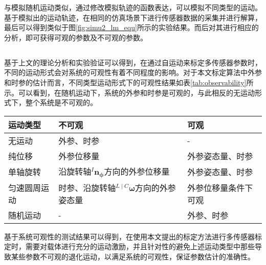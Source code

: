 与模拟随机运动类似，通过修改模拟轨迹的函数表达，可以模拟不同类型的运动。基于模拟出的运动轨迹，在相同的仿真场景下进行传感器数据的采集并进行解算，最后可以得到类似于图\ref{fig:simu2_lm_equ}所示的实验结果。而后对其进行相应的分析，即可获得可观的参数及不可观的参数。

\subsection{}
基于上文的理论分析和实验验证可以得到，在通过自运动来标定多传感器参数时，不同的运动形式会对系统的可观性有着不同程度的影响。对于本文标定算法中外参和时参的估计而言，不同类型运动形式下的可观性结果如表\ref{tab:observability}所示。可以看到，在随机运动下，系统的外参和时参是可观的，与此相反的无运动形式下，整个系统是不可观的。
\begin{table*}[htbp]
  \centering
  \normf
  \begin{tabular}{l|ll}
    \hline
    {运动类型}     & {不可观}                                                             & {可观}                 \\ \hline
    {无运动}       & {外参、时参}                                                         & {-}                    \\
    {纯位移}       & {外参位移量}                                                         & {外参姿态量、时参}     \\
    {单轴旋转}     & {沿旋转轴${^{I}\boldsymbol{n}_{\boldsymbol{\phi}}}$方向的外参位移量} & {外参姿态量、时参}     \\
    {匀速圆周运动} & {时参、沿旋转轴${^{L\mid C}\boldsymbol{\omega}}$方向的外参姿态量}    & {外参位移量条件下可观} \\
    {随机运动}     & {-}                                                                  & {外参、时参}           \\
    \hline
  \end{tabular}
  \caption{}
  \label{tab:observability}
\end{table*}

基于系统可观性的测试结果可以得到，在使用本文提出的标定方法进行多传感器标定时，需要对载体进行充分的运动激励，并且针对性的避免上述运动类型中那些导致某些参数不可观的退化运动，以满足系统的可观性，保证参数估计的准确性。
